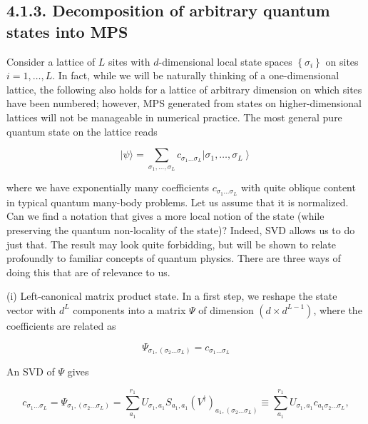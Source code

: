 \documentclass[12pt]{article}
\begin{document}
\subsection*{4.1.3. Decomposition of arbitrary quantum states into MPS}
Consider a lattice of $L$ sites with $d$-dimensional local state spaces $\left\{\sigma_{i}\right\}$ on sites $i=1, \ldots, L$. In fact, while we will be naturally thinking of a one-dimensional lattice, the following also holds for a lattice of arbitrary dimension on which sites have been numbered; however, MPS generated from states on higher-dimensional lattices will not be manageable in numerical practice. The most general pure quantum state on the lattice reads


\begin{equation*}
|\psi\rangle=\sum_{\sigma_{1}, \ldots, \sigma_{L}} c_{\sigma_{1} \ldots \sigma_{L}}\left|\sigma_{1}, \ldots, \sigma_{L}\right\rangle \tag{30}
\end{equation*}


where we have exponentially many coefficients $c_{\sigma_{1} \ldots \sigma_{L}}$ with quite oblique content in typical quantum many-body problems. Let us assume that it is normalized. Can we find a notation that gives a more local notion of the state (while preserving the quantum non-locality of the state)? Indeed, SVD allows us to do just that. The result may look quite forbidding, but will be shown to relate profoundly to familiar concepts of quantum physics. There are three ways of doing this that are of relevance to us.

(i) Left-canonical matrix product state. In a first step, we reshape the state vector with $d^{L}$ components into a matrix $\Psi$ of dimension $\left(d \times d^{L-1}\right)$, where the coefficients are related as


\begin{equation*}
\Psi_{\sigma_{1},\left(\sigma_{2} \ldots \sigma_{L}\right)}=c_{\sigma_{1} \ldots \sigma_{L}} \tag{31}
\end{equation*}


An SVD of $\Psi$ gives


\begin{equation*}
c_{\sigma_{1} \ldots \sigma_{L}}=\Psi_{\sigma_{1},\left(\sigma_{2} \ldots \sigma_{L}\right)}=\sum_{a_{1}}^{r_{1}} U_{\sigma_{1}, a_{1}} S_{a_{1}, a_{1}}\left(V^{\dagger}\right)_{a_{1},\left(\sigma_{2} \ldots \sigma_{L}\right)} \equiv \sum_{a_{1}}^{r_{1}} U_{\sigma_{1}, a_{1}} c_{a_{1} \sigma_{2} \ldots \sigma_{L}}, \tag{32}
\end{equation*}
\end{document}
